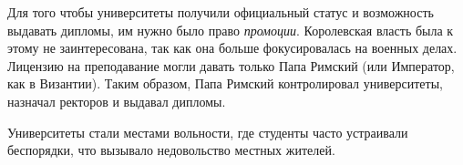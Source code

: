 
Для того чтобы университеты получили официальный статус и возможность выдавать дипломы, им нужно было право \textit{промоции}. Королевская власть была к этому не заинтересована, так как она больше фокусировалась на военных делах. Лицензию на преподавание могли давать только Папа Римский (или Император, как в Византии). Таким образом, Папа Римский контролировал университеты, назначал ректоров и выдавал дипломы. 

Университеты стали местами вольности, где студенты часто устраивали беспорядки, что вызывало недовольство местных жителей.

